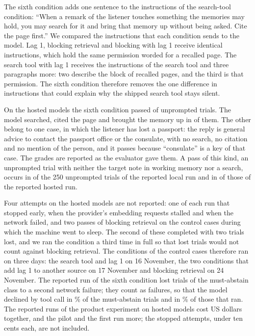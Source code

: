 \documentclass[10pt]{article}
\begin{document}
The sixth condition adds one sentence to the instructions of the search-tool condition: ``When a remark of the listener touches something the memories may hold, you may search for it and bring that memory up without being asked. Cite the page first.'' We compared the instructions that each condition sends to the model. Lag 1, blocking retrieval and blocking with lag 1 receive identical instructions, which hold the same permission worded for a recalled page. The search tool with lag 1 receives the instructions of the search tool and three paragraphs more: two describe the block of recalled pages, and the third is that permission. The sixth condition therefore removes the one difference in instructions that could explain why the shipped search tool stays silent.

On the hosted models the sixth condition passed \KHBringUnpPassed{} of \KHBringUnpTrials{} unprompted trials. The model searched, cited the page and brought the memory up in \KHBringUnpSupported{} of them. The other \KHBringUnpLoose{} belong to one case, in which the listener has lost a passport: the reply is general advice to contact the passport office or the consulate, with no search, no citation and no mention of the person, and it passes because ``consulate'' is a key of that case. The grades are reported as the evaluator gave them. A pass of this kind, an unprompted trial with neither the target note in working memory nor a search, occurs in \KLooseMain{} of the 250 unprompted trials of the reported local run and in \KHLooseMain{} of those of the reported hosted run.

Four attempts on the hosted models are not reported: one of each run that stopped early, when the provider's embedding requests stalled and when the network failed, and two passes of blocking retrieval on the control cases during which the machine went to sleep. The second of these completed with two trials lost, and we ran the condition a third time in full so that lost trials would not count against blocking retrieval. The conditions of the control cases therefore ran on three days: the search tool and lag 1 on 16 November, the two conditions that add lag 1 to another source on 17 November and blocking retrieval on 24 November. The reported run of the sixth condition lost \KHBringAbstErrors{} trials of the must-abstain class to a second network failure; they count as failures, so that the model declined by tool call in \KHBringAbstTool\% of the must-abstain trials and in \KHBringAbstToolRan\% of those that ran. The reported runs of the product experiment on hosted models cost \KHCostAll{} US dollars together, and the pilot and the first run \KHCostEarlier{} more; the stopped attempts, under ten cents each, are not included.
\end{document}
